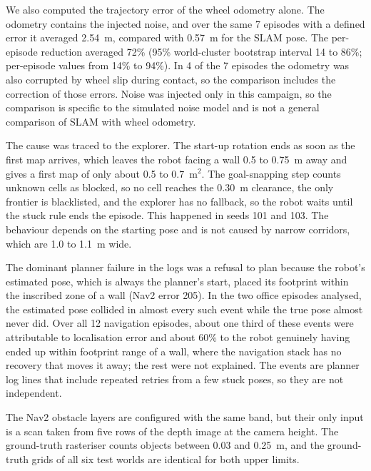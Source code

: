 
We also computed the trajectory error of the wheel odometry alone. The odometry contains the injected noise, and over the same 7 episodes with a defined error it averaged 2.54~m, compared with 0.57~m for the SLAM pose. The per-episode reduction averaged 72\% (95\% world-cluster bootstrap interval 14 to 86\%; per-episode values from 14\% to 94\%). In 4 of the 7 episodes the odometry was also corrupted by wheel slip during contact, so the comparison includes the correction of those errors. Noise was injected only in this campaign, so the comparison is specific to the simulated noise model and is not a general comparison of SLAM with wheel odometry.

The cause was traced to the explorer. The start-up rotation ends as soon as the first map arrives, which leaves the robot facing a wall 0.5 to 0.75~m away and gives a first map of only about 0.5 to 0.7~m$^2$. The goal-snapping step counts unknown cells as blocked, so no cell reaches the 0.30~m clearance, the only frontier is blacklisted, and the explorer has no fallback, so the robot waits until the stuck rule ends the episode. This happened in seeds 101 and 103. The behaviour depends on the starting pose and is not caused by narrow corridors, which are 1.0 to 1.1~m wide.

The dominant planner failure in the logs was a refusal to plan because the robot's estimated pose, which is always the planner's start, placed its footprint within the inscribed zone of a wall (Nav2 error 205). In the two office episodes analysed, the estimated pose collided in almost every such event while the true pose almost never did. Over all 12 navigation episodes, about one third of these events were attributable to localisation error and about 60\% to the robot genuinely having ended up within footprint range of a wall, where the navigation stack has no recovery that moves it away; the rest were not explained. The events are planner log lines that include repeated retries from a few stuck poses, so they are not independent.

The Nav2 obstacle layers are configured with the same band, but their only input is a scan taken from five rows of the depth image at the camera height. The ground-truth rasteriser counts objects between 0.03 and 0.25~m, and the ground-truth grids of all six test worlds are identical for both upper limits.

